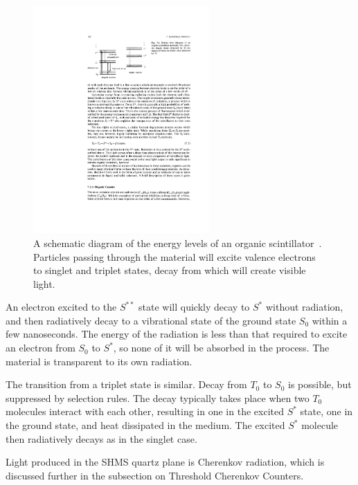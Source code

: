 \begin{figure}[!h]
    \centering
    \includegraphics[width=0.6\textwidth]{chap3/leo_scintillator_energy_levels.pdf}
    \caption{A schematic diagram of the energy levels of an organic
             scintillator~\cite{Leo_1994}. Particles passing through the
             material will excite valence electrons to singlet and triplet
             states, decay from which will create visible light.}
    \label{fig:leo_scintillator_energy_levels}
\end{figure}

An electron excited to the $S^{**}$ state will quickly decay to $S^*$ without
radiation, and then radiatively decay to a vibrational state of the ground
state $S_0$ within a few nanoseconds.
The energy of the radiation is less than that required to excite an electron
from $S_0$ to $S^*$, so none of it will be absorbed in the process.
The material is transparent to its own radiation.

The transition from a triplet state is similar.
Decay from $T_0$ to $S_0$ is possible, but suppressed by selection rules.
The decay typically takes place when two $T_0$ molecules interact with each
other, resulting in one in the excited $S^*$ state, one in the ground state,
and heat dissipated in the medium. The excited $S^*$ molecule then radiatively
decays as in the singlet case.

Light produced in the SHMS quartz plane is Cherenkov radiation, which is
discussed further in the subsection on Threshold Cherenkov Counters.

